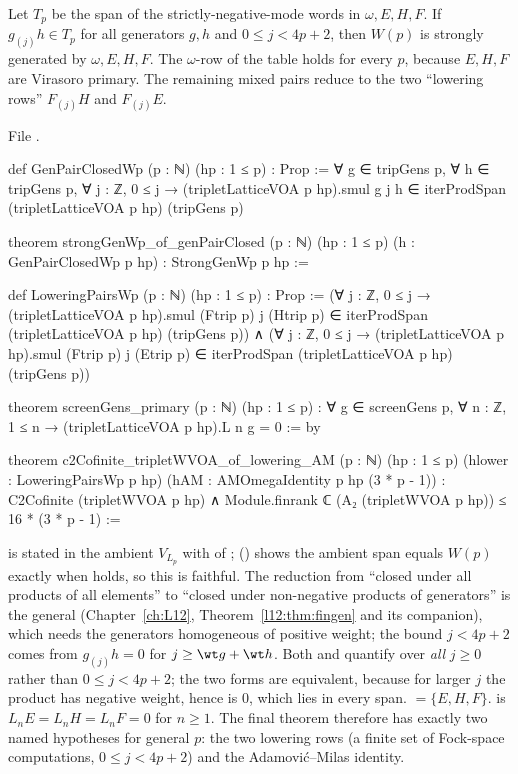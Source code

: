 \begin{theorem}\label{l18:thm:pairs}
Let $T_p$ be the span of the strictly-negative-mode words in $\omega,E,H,F$. If $g_{(j)}h\in T_p$ for
all generators $g,h$ and $0\le j<4p+2$, then $W(p)$ is strongly generated by $\omega,E,H,F$. The
$\omega$-row of the table holds for every $p$, because $E,H,F$ are Virasoro primary. The remaining
mixed pairs reduce to the two ``lowering rows'' $F_{(j)}H$ and $F_{(j)}E$.
\end{theorem}
\noindent File .
\begin{leancode}
def GenPairClosedWp (p : ℕ) (hp : 1 ≤ p) : Prop :=
  ∀ g ∈ tripGens p, ∀ h ∈ tripGens p, ∀ j : ℤ, 0 ≤ j →
    (tripletLatticeVOA p hp).smul g j h ∈ iterProdSpan (tripletLatticeVOA p hp) (tripGens p)

theorem strongGenWp_of_genPairClosed (p : ℕ) (hp : 1 ≤ p) (h : GenPairClosedWp p hp) :
    StrongGenWp p hp :=

def LoweringPairsWp (p : ℕ) (hp : 1 ≤ p) : Prop :=
  (∀ j : ℤ, 0 ≤ j →
      (tripletLatticeVOA p hp).smul (Ftrip p) j (Htrip p)
        ∈ iterProdSpan (tripletLatticeVOA p hp) (tripGens p))
    ∧
  (∀ j : ℤ, 0 ≤ j →
      (tripletLatticeVOA p hp).smul (Ftrip p) j (Etrip p)
        ∈ iterProdSpan (tripletLatticeVOA p hp) (tripGens p))

theorem screenGens_primary (p : ℕ) (hp : 1 ≤ p) :
    ∀ g ∈ screenGens p, ∀ n : ℤ, 1 ≤ n → (tripletLatticeVOA p hp).L n g = 0 := by

theorem c2Cofinite_tripletWVOA_of_lowering_AM (p : ℕ) (hp : 1 ≤ p)
    (hlower : LoweringPairsWp p hp) (hAM : AMOmegaIdentity p hp (3 * p - 1)) :
    C2Cofinite (tripletWVOA p hp)
      ∧ Module.finrank ℂ (A₂ (tripletWVOA p hp)) ≤ 16 * (3 * p - 1) :=
\end{leancode}
\begin{dictionary}
 is stated in the ambient $V_{L_p}$ with  of
;  () shows the ambient span
equals $W(p)$ exactly when  holds, so this is faithful. The reduction from ``closed
under all products of all elements'' to ``closed under non-negative products of generators'' is the
general  (Chapter~\ref{ch:L12}, Theorem~\ref{l12:thm:fingen} and its companion),
which needs the generators homogeneous of positive weight; the bound $j<4p+2$ comes from
$g_{(j)}h=0$ for $j\ge\wt g+\wt h$. Both  and  quantify over
\emph{all} $j\ge0$ rather than $0\le j<4p+2$; the two forms are equivalent, because for larger $j$ the
product has negative weight, hence is $0$, which lies in every span.  $=\{E,H,F\}$.  is
$L_nE=L_nH=L_nF=0$ for $n\ge1$. The final theorem therefore has exactly two named hypotheses for general
$p$: the two lowering rows (a finite set of Fock-space computations, $0\le j<4p+2$) and the
Adamovi\'c--Milas identity.
\end{dictionary}
